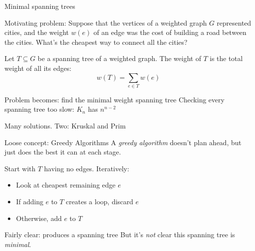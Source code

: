 \documentclass{beamer}
\begin{document}
\begin{frame}{Minimal spanning trees}
\begin{block}{Motivating problem:}
  Suppose that the vertices of a weighted graph $G$ represented cities, and the weight $w(e)$ of an edge was the cost of building a road between the cities.  What's the cheapest way to connect all the cities?
\end{block}
  \begin{definition} Let $T\subseteq G$ be a spanning tree of a weighted graph.  The weight of $T$ is the total weight of all its edges:
    $$w(T)=\sum_{e\in T}w(e)$$
 \end{definition}
  \begin{block}{Problem becomes: find the minimal weight spanning tree}
    Checking every spanning tree too slow: $K_n$ has $n^{n-2}$
    \end{block}
\end{frame}

\begin{frame}{Many solutions.  Two: Kruskal and Prim}
  \begin{block}{Loose concept: Greedy Algorithms}
    A \emph{greedy algorithm} doesn't plan ahead, but just does the best it can at each stage.
  \end{block}

  \begin{definition}
Start with $T$ having no edges. Iteratively:
    \begin{itemize}
    \item Look at cheapest remaining edge $e$
    \item If adding $e$ to $T$ creates a loop, discard $e$
    \item Otherwise, add $e$ to $T$
      \end{itemize}
\end{definition}
  \begin{block}{Fairly clear: produces a spanning tree}
    But it's \emph{not} clear this spanning tree is \emph{minimal}.
  \end{block}
\end{frame}
\end{document}

